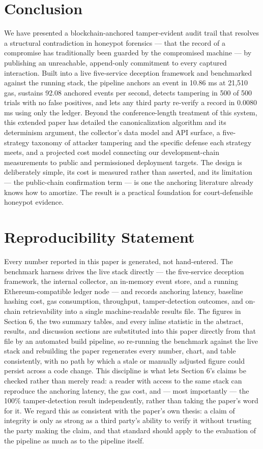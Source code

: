 \documentclass[journal]{IEEEtran}
\begin{document}
\section{Conclusion}

We have presented a blockchain-anchored tamper-evident audit trail that resolves a structural contradiction in honeypot forensics --- that the record of a compromise has traditionally been guarded by the compromised machine --- by publishing an unreachable, append-only commitment to every captured interaction. Built into a live five-service deception framework and benchmarked against the running stack, the pipeline anchors an event in 10.86 ms at 21,510 gas, sustains 92.08 anchored events per second, detects tampering in 500 of 500 trials with no false positives, and lets any third party re-verify a record in 0.0080 ms using only the ledger. Beyond the conference-length treatment of this system, this extended paper has detailed the canonicalization algorithm and its determinism argument, the collector's data model and API surface, a five-strategy taxonomy of attacker tampering and the specific defense each strategy meets, and a projected cost model connecting our development-chain measurements to public and permissioned deployment targets. The design is deliberately simple, its cost is measured rather than asserted, and its limitation --- the public-chain confirmation term --- is one the anchoring literature already knows how to amortize. The result is a practical foundation for court-defensible honeypot evidence.

\section{Reproducibility Statement}

Every number reported in this paper is generated, not hand-entered. The benchmark harness drives the live stack directly --- the five-service deception framework, the internal collector, an in-memory event store, and a running Ethereum-compatible ledger node --- and records anchoring latency, baseline hashing cost, gas consumption, throughput, tamper-detection outcomes, and on-chain retrievability into a single machine-readable results file. The figures in Section 6, the two summary tables, and every inline statistic in the abstract, results, and discussion sections are substituted into this paper directly from that file by an automated build pipeline, so re-running the benchmark against the live stack and rebuilding the paper regenerates every number, chart, and table consistently, with no path by which a stale or manually adjusted figure could persist across a code change. This discipline is what lets Section 6's claims be checked rather than merely read: a reader with access to the same stack can reproduce the anchoring latency, the gas cost, and --- most importantly --- the 100\% tamper-detection result independently, rather than taking the paper's word for it. We regard this as consistent with the paper's own thesis: a claim of integrity is only as strong as a third party's ability to verify it without trusting the party making the claim, and that standard should apply to the evaluation of the pipeline as much as to the pipeline itself.
\end{document}
